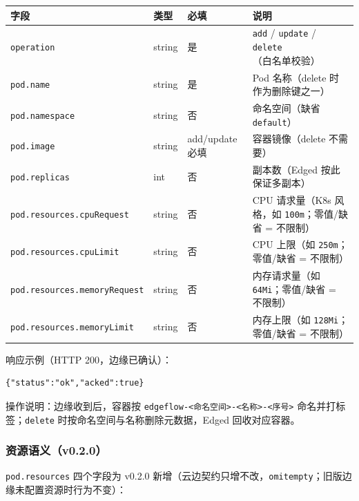 \begin{tabularx}{\textwidth}{l l l X}
  \toprule
  \textbf{字段} & \textbf{类型} & \textbf{必填} & \textbf{说明} \\
  \midrule
  \texttt{operation} & string & 是 & \texttt{add} / \texttt{update} / \texttt{delete}（白名单校验） \\
  \texttt{pod.name} & string & 是 & Pod 名称（delete 时作为删除键之一） \\
  \texttt{pod.namespace} & string & 否 & 命名空间（缺省 \texttt{default}） \\
  \texttt{pod.image} & string & add/update 必填 & 容器镜像（delete 不需要） \\
  \texttt{pod.replicas} & int & 否 & 副本数（Edged 按此保证多副本） \\
  \texttt{pod.resources.cpuRequest} & string & 否 & CPU 请求量（K8s 风格，如 \texttt{100m}；零值/缺省 = 不限制） \\
  \texttt{pod.resources.cpuLimit} & string & 否 & CPU 上限（如 \texttt{250m}；零值/缺省 = 不限制） \\
  \texttt{pod.resources.memoryRequest} & string & 否 & 内存请求量（如 \texttt{64Mi}；零值/缺省 = 不限制） \\
  \texttt{pod.resources.memoryLimit} & string & 否 & 内存上限（如 \texttt{128Mi}；零值/缺省 = 不限制） \\
  \bottomrule
\end{tabularx}

响应示例（HTTP 200，边缘已确认）：

\begin{lstlisting}
{"status":"ok","acked":true}
\end{lstlisting}

操作说明：边缘收到后，容器按 \texttt{edgeflow-<命名空间>-<名称>-<序号>} 命名并打标签；\texttt{delete} 时按命名空间与名称删除元数据，Edged 回收对应容器。

\subsubsection{资源语义（v0.2.0）}

\texttt{pod.resources} 四个字段为 v0.2.0 新增（云边契约只增不改，\texttt{omitempty}；旧版边缘未配置资源时行为不变）：

